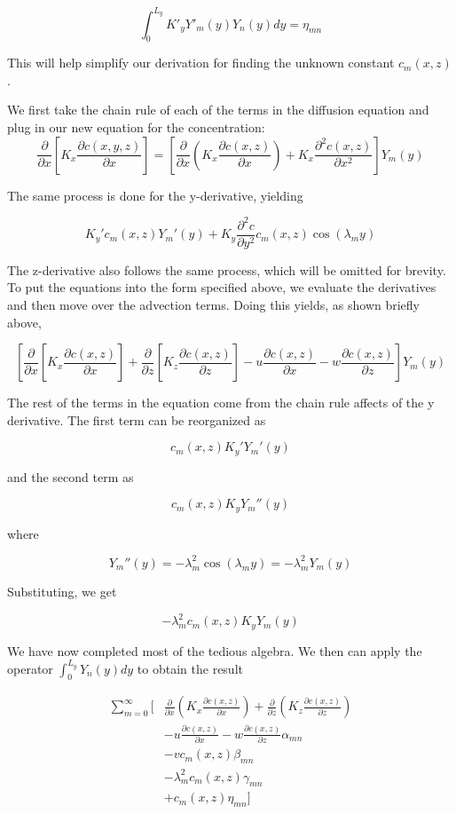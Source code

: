 \documentclass{article}
\begin{document}
$$
    \int_0^{L_y} K'_y Y'_m(y)Y_n(y) dy = \eta_{mn}
$$

This will help simplify our derivation for finding the unknown constant $c_m(x, z)$.

We first take the chain rule of each of the terms in the diffusion equation and plug in our new equation for the concentration:
$$
    \frac{\partial}{\partial x} [K_x \frac{\partial c(x, y, z)}{\partial x}] = [\frac{\partial}{\partial x} (K_x \frac{\partial c(x, z)}{\partial x}) + K_x \frac{\partial^2 c(x, z)}{\partial x^2}]Y_m(y)
$$

The same process is done for the y-derivative, yielding

$$
    K_y' c_m(x, z) Y_m'(y) + K_y \frac{\partial^2 c}{\partial y^2} c_m(x, z) \cos(\lambda_m y)
$$

The z-derivative also follows the same process, which will be omitted for brevity. To put the equations into the form specified above, we evaluate 
the derivatives and then move over the advection terms. Doing this yields, as shown briefly above,

$$
    [\frac{\partial}{\partial x} [K_x \frac{\partial c(x, z)}{\partial x}] + \frac{\partial}{\partial z} [K_z \frac{\partial c(x, z)}{\partial z}] - u \frac{\partial c(x, z)}{\partial x} - w \frac{\partial c(x, z)}{\partial z}] Y_m(y)
$$

The rest of the terms in the equation come from the chain rule affects of the y derivative. The first term can be reorganized as

$$
    c_m(x, z) K_y' Y_m'(y)
$$

and the second term as 

$$
    c_m(x, z) K_y Y_m''(y)
$$

where 

$$
    Y_m''(y) = -\lambda_m^2 \cos(\lambda_m y) = -\lambda_m^2 Y_m(y)
$$

Substituting, we get 

$$
    -\lambda_m^2 c_m(x, z) K_y Y_m(y)
$$

We have now completed most of the tedious algebra. We then can apply the operator $\int_0^{L_y} Y_n(y) dy$ to obtain the result


\begin{equation}
\begin{aligned}
    \sum_{m=0}^{\infty} \Bigg[ &\frac{\partial}{\partial x} \left( K_x \frac{\partial c(x, z)}{\partial x} \right) + \frac{\partial}{\partial z} \left( K_z \frac{\partial c(x, z)}{\partial z} \right) \\
    &- u \frac{\partial c(x, z)}{\partial x} - w \frac{\partial c(x, z)}{\partial z}  \alpha_{mn} \\
    &- v c_m(x, z) \beta_{mn} \\
    &- \lambda_m^2 c_m(x, z) \gamma_{mn} \\
    &+ c_m(x, z) \eta_{mn} \Bigg]
\end{aligned}
\end{equation}
\end{document}
